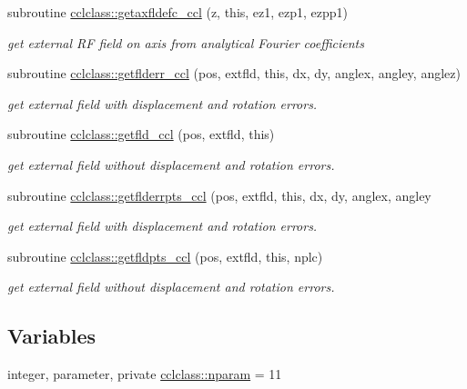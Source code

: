\begin{DoxyCompactItemize}
subroutine \mbox{\hyperlink{namespacecclclass_a06d52f7ecb50e977ef5e2330506180d2}{cclclass\+::getaxfldefc\+\_\+ccl}} (z, this, ez1, ezp1, ezpp1)
\begin{DoxyCompactList}\small\item\em get external RF field on axis from analytical Fourier coefficients \end{DoxyCompactList}\item 
subroutine \mbox{\hyperlink{namespacecclclass_a4d8386891ff89c7352f001b01d5f84b5}{cclclass\+::getflderr\+\_\+ccl}} (pos, extfld, this, dx, dy, anglex, angley, anglez)
\begin{DoxyCompactList}\small\item\em get external field with displacement and rotation errors. \end{DoxyCompactList}\item 
subroutine \mbox{\hyperlink{namespacecclclass_a6c8d8825e6d50c30ba91c90892619a5b}{cclclass\+::getfld\+\_\+ccl}} (pos, extfld, this)
\begin{DoxyCompactList}\small\item\em get external field without displacement and rotation errors. \end{DoxyCompactList}\item 
subroutine \mbox{\hyperlink{namespacecclclass_a22dde155eb6d5e19ccedbe59cd955580}{cclclass\+::getflderrpts\+\_\+ccl}} (pos, extfld, this, dx, dy, anglex, angley
\begin{DoxyCompactList}\small\item\em get external field with displacement and rotation errors. \end{DoxyCompactList}\item 
subroutine \mbox{\hyperlink{namespacecclclass_aa98c971191ca605d023e7c03c447566a}{cclclass\+::getfldpts\+\_\+ccl}} (pos, extfld, this, nplc)
\begin{DoxyCompactList}\small\item\em get external field without displacement and rotation errors. \end{DoxyCompactList}\end{DoxyCompactItemize}
\subsection*{Variables}
\begin{DoxyCompactItemize}
\item 
integer, parameter, private \mbox{\hyperlink{namespacecclclass_adeb399ff41e54cda7bdefa51063c0de6}{cclclass\+::nparam}} = 11
\end{DoxyCompactItemize}


